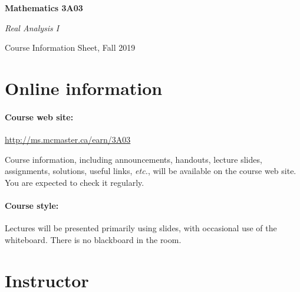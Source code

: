 \documentclass[12pt]{article}
\begin{document}

\vspace{-2cm}

{\Large\parindent=0pt

{\bfseries Mathematics 3A03

{\slshape Real Analysis I}

Course Information Sheet, Fall 2019


}}

\bigskip

\noindent

\section*{Online information}

\paragraph*{Course web site:} \url{http://ms.mcmaster.ca/earn/3A03}

\noindent
Course information, including announcements, handouts, lecture slides,
assignments, solutions, useful links, {\it etc.\/}, will be available
on the course web site.  You are expected to check it regularly.

\paragraph*{Course style:}
Lectures will be presented primarily using slides, with occasional use
of the whiteboard.  There is no blackboard in the room.

\section*{Instructor}
\end{document}
